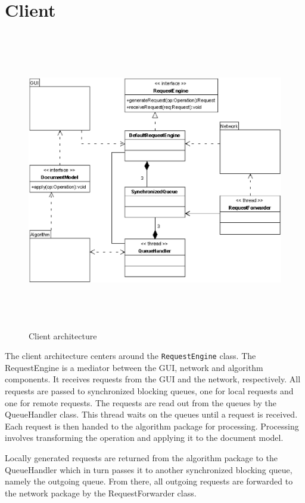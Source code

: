 \section{Client}
\begin{figure}[H]
\centering
\includegraphics[height=13.04cm,width=15.46cm]{../../images/algo-impl/client_diagram.eps}
\caption{Client architecture}
\label{Client architecture}
\end{figure}

The client architecture centers around the \texttt{RequestEngine} class. The RequestEngine is a mediator between the GUI, network and algorithm components. It receives requests from the GUI and the network, respectively. All requests are passed to synchronized blocking queues, one for local requests and one for remote requests. The requests are read out from the queues by the QueueHandler class. This thread waits on the queues until a request is received. Each request is then handed to the algorithm package for processing. Processing involves transforming the operation and applying it to the document model. 

Locally generated requests are returned from the algorithm package to the QueueHandler which in turn passes it to another synchronized blocking queue, namely the outgoing queue. From there, all outgoing requests are forwarded to the network package by the RequestForwarder class. 


